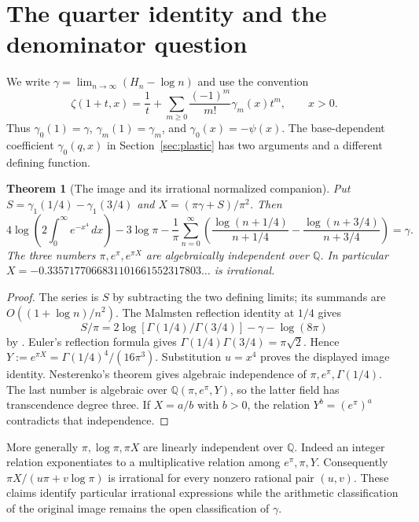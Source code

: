 \documentclass[11pt,a4paper]{article}
\newtheorem{theorem}{Theorem}[section]
\theoremstyle{definition}\newtheorem{definition}[theorem]{Definition}\newtheorem{example}[theorem]{Example}
\theoremstyle{remark}\newtheorem{remark}[theorem]{Remark}
\newcommand{\Q}{\mathbb Q}\newcommand{\Z}{\mathbb Z}\newcommand{\R}{\mathbb R}\newcommand{\N}{\mathbb N}
\begin{document}
\section{The quarter identity and the denominator question}
We write $\gamma=\lim_{n\to\infty}(H_n-\log n)$ and use the convention
\begin{equation}\label{eq:hurwitz}
\zeta(1+t,x)=\frac1t+\sum_{m\ge0}\frac{(-1)^m}{m!}\gamma_m(x)t^m,\qquad x>0 .
\end{equation}
Thus $\gamma_0(1)=\gamma$, $\gamma_m(1)=\gamma_m$, and $\gamma_0(x)=-\psi(x)$.
The base-dependent coefficient $\gamma_0(q,x)$ in Section~\ref{sec:plastic} has two arguments and a different defining function.

\begin{theorem}[The image and its irrational normalized companion]\label{thm:quarter}
Put $S=\gamma_1(1/4)-\gamma_1(3/4)$ and $X=(\pi\gamma+S)/\pi^2$. Then
\[
4\log\!\left(2\int_0^\infty e^{-x^4}\,dx\right)-3\log\pi-
\frac1\pi\sum_{n=0}^{\infty}
\left(\frac{\log(n+1/4)}{n+1/4}-\frac{\log(n+3/4)}{n+3/4}\right)=\gamma.
\]
The three numbers $\pi,e^\pi,e^{\pi X}$ are algebraically independent over $\Q$. In particular $X=-0.3357177066831101661552317803\ldots$ is irrational.
\end{theorem}
\begin{proof}
The series is $S$ by subtracting the two defining limits; its summands are $O((1+\log n)/n^2)$. The Malmsten reflection identity at $1/4$ gives
\[
S/\pi=2\log[\Gamma(1/4)/\Gamma(3/4)]-\gamma-\log(8\pi)
\]
by \cite[formula (16)]{Blagouchine}. Euler's reflection formula gives $\Gamma(1/4)\Gamma(3/4)=\pi\sqrt2$. Hence
$Y:=e^{\pi X}=\Gamma(1/4)^4/(16\pi^3)$. Substitution $u=x^4$ proves the displayed image identity. Nesterenko's theorem \cite{Nesterenko} gives algebraic independence of $\pi,e^\pi,\Gamma(1/4)$. The last number is algebraic over $\Q(\pi,e^\pi,Y)$, so the latter field has transcendence degree three. If $X=a/b$ with $b>0$, the relation $Y^b=(e^\pi)^a$ contradicts that independence.
\end{proof}
More generally $\pi,\log\pi,\pi X$ are linearly independent over $\Q$. Indeed an integer relation exponentiates to a multiplicative relation among $e^\pi,\pi,Y$. Consequently $\pi X/(u\pi+v\log\pi)$ is irrational for every nonzero rational pair $(u,v)$. These claims identify particular irrational expressions while the arithmetic classification of the original image remains the open classification of $\gamma$.
\end{document}
